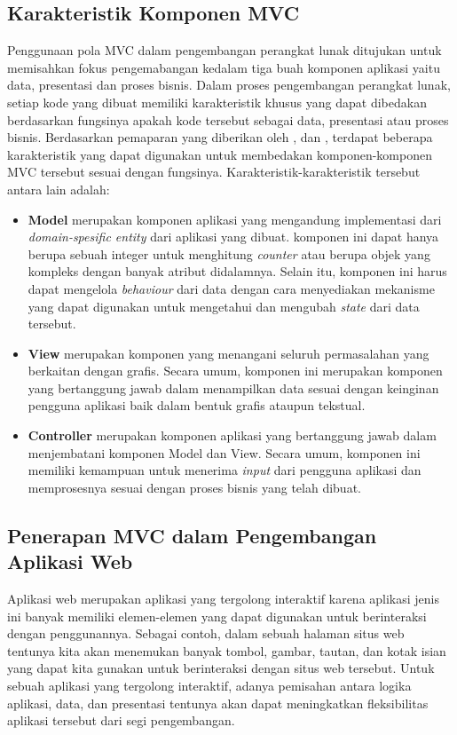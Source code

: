 \subsection{Karakteristik Komponen MVC}

Penggunaan pola MVC dalam pengembangan perangkat lunak ditujukan untuk memisahkan fokus pengemabangan kedalam tiga buah komponen aplikasi yaitu data, presentasi dan proses bisnis. Dalam proses pengembangan perangkat lunak, setiap kode yang dibuat memiliki karakteristik khusus yang dapat dibedakan berdasarkan fungsinya apakah kode tersebut sebagai data, presentasi atau proses bisnis. Berdasarkan pemaparan yang diberikan oleh \cite{krasner1988desc}, \cite{leff2001web} dan \cite{burbeck1992applications}, terdapat beberapa karakteristik yang dapat digunakan untuk membedakan komponen-komponen MVC tersebut sesuai dengan fungsinya. Karakteristik-karakteristik tersebut antara lain adalah:

\begin{itemize}
    \item \textbf{Model} merupakan komponen aplikasi yang mengandung implementasi dari \textit{domain-spesific entity} dari aplikasi yang dibuat. komponen ini dapat hanya berupa sebuah integer untuk menghitung \textit{counter} atau berupa objek yang kompleks dengan banyak atribut didalamnya. Selain itu, komponen ini harus dapat mengelola  \textit{behaviour} dari data dengan cara menyediakan mekanisme yang dapat digunakan untuk mengetahui dan mengubah \textit{state} dari data tersebut.
    \item \textbf{View} merupakan komponen yang menangani seluruh permasalahan yang berkaitan dengan grafis. Secara umum, komponen ini merupakan komponen yang bertanggung jawab dalam menampilkan data sesuai dengan keinginan pengguna aplikasi baik dalam bentuk grafis ataupun tekstual.
    \item \textbf{Controller} merupakan komponen aplikasi yang bertanggung jawab dalam menjembatani komponen Model dan View. Secara umum, komponen ini memiliki kemampuan untuk menerima \textit{input} dari pengguna aplikasi dan memprosesnya sesuai dengan proses bisnis yang telah dibuat.
\end{itemize}

\subsection{Penerapan MVC dalam Pengembangan Aplikasi Web}
Aplikasi web merupakan aplikasi yang tergolong interaktif karena aplikasi jenis ini banyak memiliki elemen-elemen yang dapat digunakan untuk berinteraksi dengan penggunannya. Sebagai contoh, dalam sebuah halaman situs web tentunya kita akan menemukan banyak tombol, gambar, tautan, dan kotak isian yang dapat kita gunakan untuk berinteraksi dengan situs web tersebut. Untuk sebuah aplikasi yang tergolong interaktif, adanya pemisahan antara logika aplikasi, data, dan presentasi tentunya akan dapat meningkatkan fleksibilitas aplikasi tersebut dari segi pengembangan. \\

